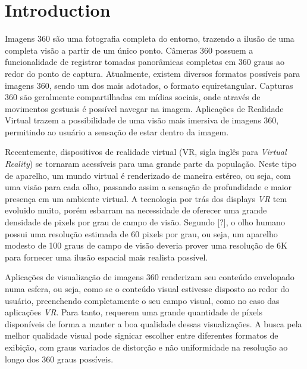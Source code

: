\documentclass[conference]{IEEEtran}
\begin{document}
\section{Introduction}
Imagens 360 são uma fotografia completa do entorno, trazendo a ilusão de uma completa visão a partir de um único ponto. Câmeras 360 possuem a funcionalidade de registrar tomadas panorâmicas completas em 360 graus ao redor do ponto de captura. Atualmente, existem diversos formatos possíveis para imagens 360, sendo um dos mais adotados, o formato equiretangular. Capturas 360 são geralmente compartilhadas em mídias sociais, onde através de movimentos gestuais é possível navegar na imagem. Aplicações de Realidade Virtual trazem a possibilidade de uma visão mais imersiva de imagens 360, permitindo ao usuário a sensação de estar dentro da imagem.

Recentemente, dispositivos de realidade virtual (VR, sigla inglês para \textit{Virtual Reality}) se tornaram acessíveis para uma grande parte da população. Neste tipo de aparelho, um mundo virtual é renderizado de maneira estéreo, ou seja, com uma visão para cada olho, passando assim a sensação de profundidade e maior presença em um ambiente virtual. A tecnologia por trás dos displays \textit{VR} tem evoluido muito, porém esbarram na necessidade de oferecer uma grande densidade de pixels por grau de campo de visão. Segundo [?], o olho humano possui uma resolução estimada de 60 pixels por grau, ou seja, um aparelho modesto de 100 graus de campo de visão deveria prover uma resolução de 6K para fornecer uma ilusão espacial mais realista possível.

Aplicações de visualização de imagens 360 renderizam seu conteúdo envelopado numa esfera, ou seja, como se o conteúdo visual estivesse disposto ao redor do usuário, preenchendo completamente o seu campo visual, como no caso das aplicações \textit{VR}. Para tanto, requerem uma grande quantidade de píxels disponíveis de forma a manter a boa qualidade dessas visualizações. A busca pela melhor qualidade visual pode signicar escolher entre diferentes formatos de exibição, com graus variados de distorção e não uniformidade na resolução ao longo dos 360 graus possíveis.
\end{document}
